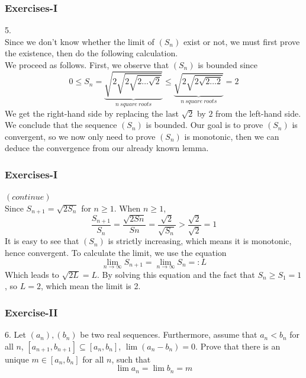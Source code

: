 \documentclass[12pt, t]{beamer}
\begin{document}
\begin{frame}
    \frametitle{Exercises-I}
5.\\
\hspace{1em} Since we don't know whether the limit of $(S_n)$ exist or not, we must first prove the existence, then do the following
calculation.\\
\hspace{1em} We proceed as follows. First, we observe that $(S_n)$ is bounded since
\begin{equation*}
    0\leq S_n=\underbrace{\sqrt{2\sqrt{2\sqrt{2\dots\sqrt{2}}}}}_{n\ square\ roots} \leq \underbrace{\sqrt{2\sqrt{2\sqrt{2\dots 2}}}}_{n\ square\ roots}=2
\end{equation*}
We get the right-hand side by replacing the last $\sqrt{2}$ by $2$ 
from the left-hand side.\\
\hspace{1em} We conclude that the sequence $(S_n)$ is bounded. Our goal is to prove $(S_n)$ is convergent, so we now only need to prove 
$(S_n)$ is monotonic, then we can deduce the convergence from our already known lemma.
\end{frame}

\begin{frame}
    \frametitle{Exercises-I}
$(continue)$\\
\hspace{1em} Since $S_{n+1}=\sqrt{2S_n}$ for $n\geq 1$. When $n\geq 1$,
\begin{equation*}
    \frac{S_{n+1}}{S_n}=\frac{\sqrt{2Sn}}{Sn}=\frac{\sqrt{2}}{\sqrt{S_n}}>\frac{\sqrt{2}}{\sqrt{2}}=1
\end{equation*}
\hspace{1em} It is easy to see that $(S_n)$ is strictly increasing, which means it is monotonic, 
hence convergent.
\hspace{1em} To calculate the limit, we use the equation 
\begin{equation*}
    \lim_{n\rightarrow\infty} S_{n+1}=\lim_{n\rightarrow\infty} S_n =: L
\end{equation*}
\hspace{1em} Which leads to $\sqrt{2L}=L$. By solving this equation and the fact that $S_n\geq S_1=1$, so $L=2$, which mean the limit is 2. 

\end{frame}


\begin{frame}
    \frametitle{Exercise-II}
6. Let $(a_n),(b_n)$ be two real sequences. Furthermore, assume that $a_n<b_n$
for all $n$, $[a_{n+1}, b_{n+1}]\subseteq [a_n,b_n]$, $\lim (a_n-b_n)=0$. Prove that there 
is an unique $m\in [a_n,b_n]$ for all $n$, such that 
\begin{equation*}
    \lim a_n=\lim b_n=m
\end{equation*}
\end{frame}
\end{document}
